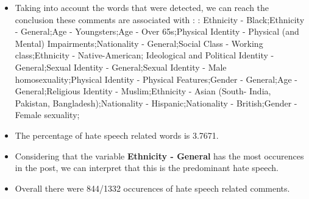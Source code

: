 \documentclass[11pt]{article}
\begin{document}
\begin{itemize}\item Taking into account the words that were detected, we can reach the conclusion these comments are associated with : : Ethnicity - Black;Ethnicity - General;Age - Youngsters;Age - Over 65s;Physical Identity - Physical (and Mental) Impairments;Nationality - General;Social Class - Working class;Ethnicity - Native-American; Ideological and Political Identity - General;Sexual Identity - General;Sexual Identity - Male homosexuality;Physical Identity - Physical Features;Gender - General;Age - General;Religious Identity - Muslim;Ethnicity - Asian (South- India, Pakistan, Bangladesh);Nationality - Hispanic;Nationality - British;Gender - Female sexuality;%

\item The percentage of hate speech related words is 3.7671.

\item Considering that the variable \textbf{Ethnicity - General} has the most occurences in the post, we can interpret that this is the predominant hate speech.

\item Overall there were 844/1332 occurences of hate speech related comments.\end{itemize}
\end{document}
